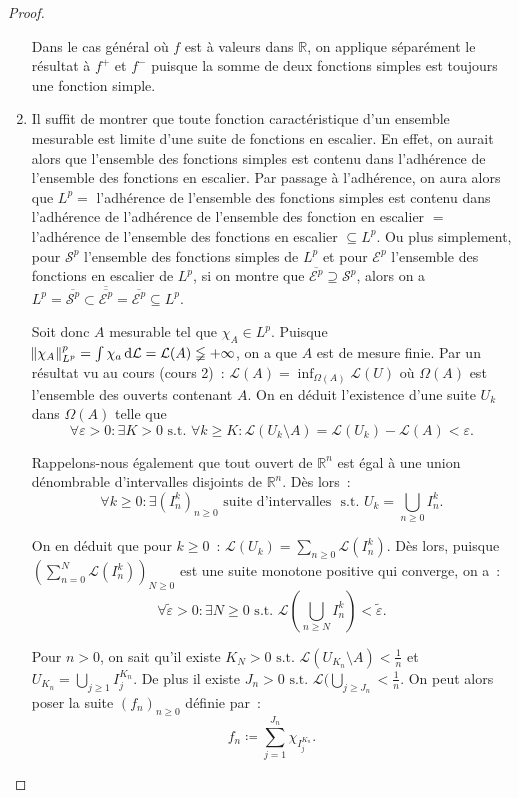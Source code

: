 \documentclass{article}
\newcommand{\pinfty}{{+\infty}}
\newcommand{\st}{\text{ s.t. }}
\newcommand{\R}{{\mathbb R}}
\begin{document}
\begin{proof}
\begin{enumerate}
	Dans le cas général où $f$ est à valeurs dans $\R$, on applique séparément le résultat à $f^+$ et $f^-$ puisque la somme de deux fonctions simples est toujours une fonction simple.

	\item Il suffit de montrer que toute fonction caractéristique d'un ensemble mesurable est limite d'une suite de fonctions en escalier. En effet, on aurait alors que
	l'ensemble des fonctions simples est contenu dans l'adhérence de l'ensemble des fonctions en escalier. Par passage à l'adhérence, on aura alors que $L^p =$ l'adhérence
	de l'ensemble des fonctions simples est contenu dans l'adhérence de l'adhérence de l'ensemble des fonction en escalier $=$ l'adhérence de l'ensemble des fonctions en escalier
	$\subseteq L^p$. Ou plus simplement, pour $\mathcal S^p$ l'ensemble des fonctions simples de $L^p$ et pour $\mathcal E^p$ l'ensemble des fonctions en escalier de $L^p$, si on montre
	que $\overline {\mathcal E^p} \supseteq \mathcal S^p$, alors on a $L^p = \overline {\mathcal S^p} \subset \overline {\overline {\mathcal E^p}}=\overline {\mathcal E^p} \subseteq L^p$.

	Soit donc $A$ mesurable tel que $\chi_A \in L^p$. Puisque $\norm {\chi_A}_{L^p}^p = \int\chi_a\dif\mathcal L = \mathcal L(A) \lneqq \pinfty$, on a que $A$ est de mesure finie.
	Par un résultat vu au cours (cours 2)~: $\mathcal L(A) = \inf_{\Omega(A)}\mathcal L(U)$ où $\Omega(A)$ est l'ensemble des ouverts contenant $A$. On en déduit l'existence d'une
	suite $U_k$ dans $\Omega(A)$ telle que
	\[\forall \varepsilon > 0 : \exists K > 0 \st \forall k \geq K : \mathcal L(U_k \setminus A) = \mathcal L(U_k)-\mathcal L(A) < \varepsilon.\]

	Rappelons-nous également que tout ouvert de $\R^n$ est égal à une union dénombrable d'intervalles disjoints de $\R^n$. Dès lors~:
	\[\forall k \geq 0 : \exists (I^k_n)_{n \geq 0} \text{ suite d'intervalles } \st U_k = \bigcup_{n \geq 0}I^k_n.\]

	On en déduit que pour $k \geq 0$~: $\mathcal L(U_k) = \sum_{n \geq 0}\mathcal L(I^k_n)$. Dès lors, puisque $(\sum_{n=0}^N\mathcal L(I^k_n))_{N \geq 0}$ est une suite monotone
	positive qui converge, on a~:
	\[\forall \tilde \varepsilon > 0 : \exists N \geq 0 \st \mathcal L\left(\bigcup_{n \geq N}I^k_n\right) < \tilde \varepsilon.\]

	Pour $n > 0$, on sait qu'il existe $K_N > 0 \st \mathcal L(U_{K_n} \setminus A) < \frac 1n$ et $U_{K_n} = \bigcup_{j \geq 1}I_j^{K_n}$. De plus il existe
	$J_n > 0 \st \mathcal L(\bigcup_{j \geq J_n} < \frac 1n$. On peut alors poser la suite $(f_n)_{n \geq 0}$ définie par~:
	\[f_n \coloneqq \sum_{j=1}^{J_n}\chi_{I_j^{K_n}}.\]


\end{enumerate}
\end{proof}
\end{document}
